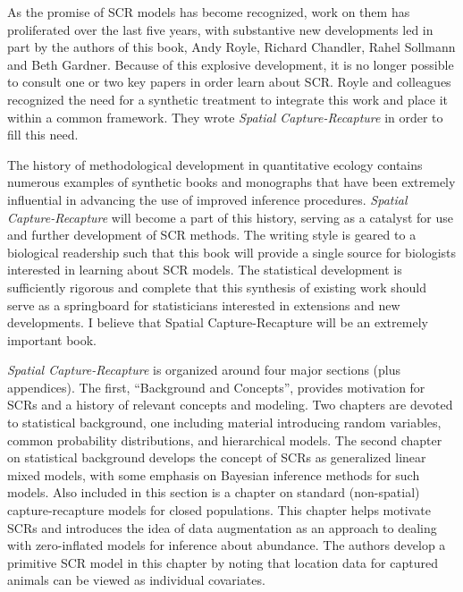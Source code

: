 As the promise of SCR models has become
recognized, work on them has proliferated over the last five years,
with substantive new developments led in part by the authors of this
book, Andy Royle, Richard Chandler, Rahel Sollmann and Beth
Gardner. Because of this explosive development, it is no longer
possible to consult one or two key papers in order learn about
SCR. Royle and colleagues recognized the need for a synthetic
treatment to integrate this work and place it within a common
framework. They wrote {\it Spatial Capture-Recapture} in order to fill this
need.  


The history of methodological development in quantitative ecology
contains numerous examples of synthetic books and monographs that have
been extremely influential in advancing the use of improved inference
procedures. {\it Spatial Capture-Recapture} will become a part of this
history, serving as a catalyst for use and further development of SCR
methods. The writing style is geared to a biological readership such
that this book will provide a single source for biologists interested
in learning about SCR models. The statistical development is
sufficiently rigorous and complete that this synthesis of existing
work should serve as a springboard for statisticians interested in
extensions and new developments. I believe that Spatial
Capture-Recapture will be an extremely important book.

{\it Spatial Capture-Recapture} is organized around four major
sections (plus appendices). The first, ``Background and Concepts'',
provides motivation for SCRs and a history of relevant concepts and
modeling. Two chapters are devoted to statistical background, one
including material introducing random variables, common probability
distributions, and hierarchical models. The second chapter on
statistical background develops the concept of SCRs as generalized
linear mixed models, with some emphasis on Bayesian inference methods
for such models. Also included in this section is a chapter on
standard (non-spatial) capture-recapture models for closed
populations. This chapter helps motivate SCRs and introduces the idea
of data augmentation as an approach to dealing with zero-inflated
models for inference about abundance. The authors develop a primitive
SCR model in this chapter by noting that location data for captured
animals can be viewed as individual covariates.



